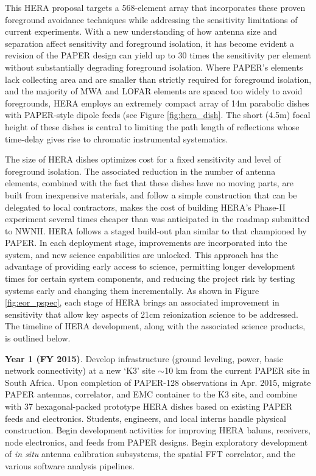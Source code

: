 \documentclass[preprint]{aastex}
\begin{document}
This HERA proposal targets a 568-element array that incorporates these proven
foreground avoidance techniques while addressing the sensitivity limitations of
current experiments.  With a new understanding of how antenna size and
separation affect sensitivity and foreground isolation, it
has become evident a revision of the PAPER design can yield up to 30
times the sensitivity per element without substantially degrading
foreground isolation.  Where PAPER's elements lack collecting area and are
smaller than strictly required for foreground isolation, and the majority of
MWA and LOFAR elements are spaced too widely to avoid foregrounds, HERA employs
an extremely compact array of 14m parabolic dishes with PAPER-style dipole
feeds (see Figure \ref{fig:hera_dish}.
The short (4.5m) focal height of these
dishes is central to limiting the path length of reflections whose time-delay
gives rise to chromatic instrumental systematics. 

The size of HERA dishes optimizes cost for a fixed sensitivity and level
of foreground isolation.  The associated reduction in the number of antenna
elements, combined with the fact that these dishes have no moving parts, are
built from inexpensive materials, and follow a simple construction that can be
delegated to local contractors, makes the cost of building HERA's Phase-II
experiment several times cheaper than was anticipated in the roadmap
submitted to NWNH.  
HERA follows a staged build-out plan similar to that championed by PAPER.  In
each deployment stage, improvements are incorporated into the system, and new
science capabilities are unlocked.  This approach has the advantage of
providing early access to science, permitting longer development times for
certain system components, and reducing the project risk by testing systems
early and changing them incrementally.  As shown in Figure \ref{fig:eor_pspec}, each
stage of HERA brings an associated improvement in sensitivity that allow key
aspects of 21cm reionization science to be addressed.  The timeline of HERA
development, along with the associated science products, is outlined below. 

{\bf Year 1 (FY 2015)}.  Develop
infrastructure (ground leveling, power, basic network connectivity) at
a new `K3' site $\sim$10 km from the current PAPER site
in South Africa.  Upon completion of PAPER-128
observations in Apr. 2015, migrate PAPER antennas,
correlator, and EMC container to the K3 site, and combine
with 37 hexagonal-packed prototype HERA dishes based on existing PAPER feeds and
electronics. Students, engineers, and local interns handle physical
construction.  Begin development activities
for improving HERA baluns, receivers, node electronics, and feeds from PAPER
designs.  Begin exploratory development of {\it in situ} antenna calibration subsystems,
the spatial FFT correlator, and the various software analysis pipelines.
\end{document}
